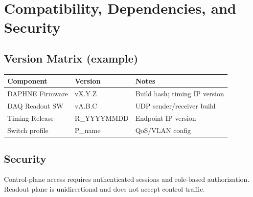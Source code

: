 
\section{Compatibility, Dependencies, and Security}
\label{sec:compat}
\subsection{Version Matrix (example)}
\begin{longtable}{@{}p{3.5cm}p{4.5cm}p{7cm}@{}}
\toprule
\textbf{Component} & \textbf{Version} & \textbf{Notes} \\\midrule
DAPHNE Firmware & vX.Y.Z & Build hash; timing IP version \\
DAQ Readout SW  & vA.B.C & UDP sender/receiver build \\
Timing Release  & R\_YYYYMMDD & Endpoint IP version \\
Switch profile  & P\_name & QoS/VLAN config \\
\bottomrule
\end{longtable}

\subsection{Security}
Control-plane access requires authenticated sessions and role-based authorization. Readout plane is unidirectional and
does not accept control traffic.
